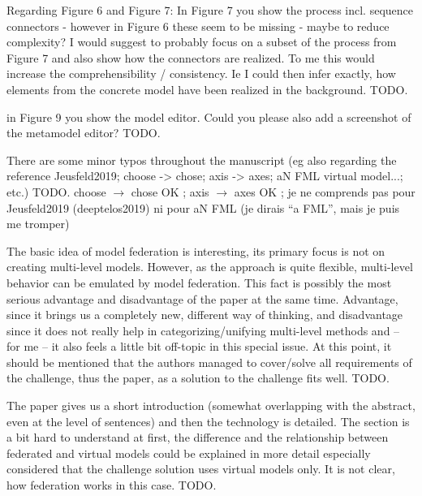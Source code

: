 \documentclass[10pt]{article}
\begin{document}
\begin{response}{Regarding Figure 6 and Figure 7: In Figure 7 you show the process incl. sequence connectors - however in Figure 6 these seem to be missing - maybe to reduce complexity? I would suggest to probably focus on a subset of the process from Figure 7 and also show how the connectors are realized. To me this would increase the comprehensibility / consistency. Ie I could then infer exactly, how elements from the concrete model have been realized in the background.} 
TODO.
\end{response}

\begin{response}{in Figure 9 you show the model editor. Could you please also add a screenshot of the metamodel editor?} 
TODO.
\end{response}

\begin{response}{There are some minor typos throughout the manuscript (eg also regarding the reference Jeusfeld2019; choose -> chose; axis -> axes; aN FML virtual model...; etc.)} 
TODO.
choose $\rightarrow$ chose OK ; axis $\rightarrow$  axes OK ; je ne comprends pas pour Jeusfeld2019
(deeptelos2019) ni pour aN FML (je dirais ``a FML'', mais je puis me tromper)
\end{response}


\pagebreak


\begin{response}{The basic idea of model federation is interesting, its primary focus is not on creating multi-level models. However, as the approach is quite flexible, multi-level behavior can be emulated by model federation. This fact is possibly the most serious advantage and disadvantage of the paper at the same time. Advantage, since it brings us a completely new, different way of thinking, and disadvantage since it does not really help in categorizing/unifying multi-level methods and – for me – it also feels a little bit off-topic in this special issue. At this point, it should be mentioned that the authors managed to cover/solve all requirements of the challenge, thus the paper, as a solution to the challenge fits well.} 
TODO.
\end{response}

\begin{response}{The paper gives us a short introduction (somewhat overlapping with the abstract, even at the level of sentences) and then the technology is detailed. The section is a bit hard to understand at first, the difference and the relationship between federated and virtual models could be explained in more detail especially considered that the challenge solution uses virtual models only. It is not clear, how federation works in this case.} 
TODO.
\end{response}
\end{document}
